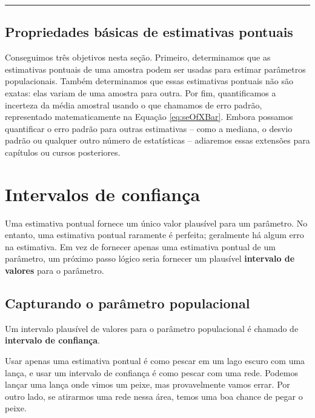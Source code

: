 \documentclass[
]{book}
\theoremstyle{definition}
\theoremstyle{definition}
\theoremstyle{definition}
\theoremstyle{definition}
\theoremstyle{remark}
\begin{document}
\begin{center}\rule{0.5\linewidth}{0.5pt}\end{center}

\hypertarget{basicPropertiesPointEstimates}{%
\subsection{Propriedades básicas de estimativas pontuais}\label{basicPropertiesPointEstimates}}

Conseguimos três objetivos nesta seção. Primeiro, determinamos que as estimativas pontuais de uma amostra podem ser usadas para estimar parâmetros populacionais. Também determinamos que essas estimativas pontuais não são exatas: elas variam de uma amostra para outra. Por fim, quantificamos a incerteza da média amostral usando o que chamamos de erro padrão, representado matematicamente na Equação \eqref{eq:seOfXBar}. Embora possamos quantificar o erro padrão para outras estimativas -- como a mediana, o desvio padrão ou qualquer outro número de estatísticas -- adiaremos essas extensões para capítulos ou cursos posteriores.

\hypertarget{confidenceIntervals}{%
\section{Intervalos de confiança}\label{confidenceIntervals}}

Uma estimativa pontual fornece um único valor plausível para um parâmetro. No entanto, uma estimativa pontual raramente é perfeita; geralmente há algum erro na estimativa. Em vez de fornecer apenas uma estimativa pontual de um parâmetro, um próximo passo lógico seria fornecer um plausível \textbf{intervalo de valores} para o parâmetro.

\hypertarget{capturingPopParameter}{%
\subsection{Capturando o parâmetro populacional}\label{capturingPopParameter}}

Um intervalo plausível de valores para o parâmetro populacional é chamado de \textbf{intervalo de confiança}.

Usar apenas uma estimativa pontual é como pescar em um lago escuro com uma lança, e usar um intervalo de confiança é como pescar com uma rede. Podemos lançar uma lança onde vimos um peixe, mas provavelmente vamos errar. Por outro lado, se atirarmos uma rede nessa área, temos uma boa chance de pegar o peixe.
\end{document}
